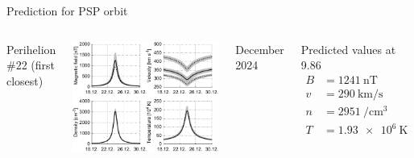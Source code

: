 \begin{frame}[plain,c]{Prediction for PSP orbit}{}
	\begin{columns}[c]
		
		\centering
		Perihelion \#22 (first closest)\\\ 
		
		\includegraphics[width=\textwidth]{../talk_figures/SPP_perihelia_prediction_nearest_f_defense.pdf}
		
		
		December 2024
		
		
		\begin{block}{\centering Predicted values at 9.86\,\Rs}
			\begin{align*}
				B &= \SI{1241}{\nano\tesla}\\
				v &= \SI{290}{\km\per\s}\\
				n &= \SI{2951}{\per\cm\cubed}\\
				T &= \SI{1.93e6}{\kelvin}
			\end{align*}
		\end{block}
		
	\end{columns}
\end{frame}
